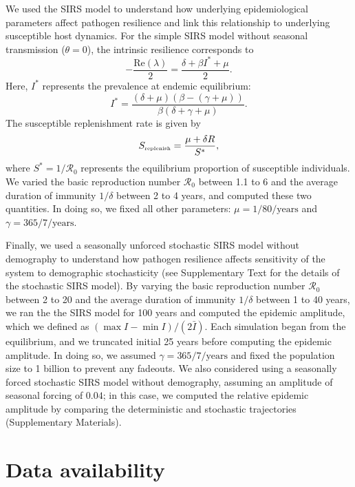 \documentclass[12pt]{article}
\newcommand{\tsub}[2]{#1_{{\textrm{\tiny #2}}}}
\begin{document}
We used the SIRS model to understand how underlying epidemiological parameters affect pathogen resilience and link this relationship to underlying susceptible host dynamics.
For the simple SIRS model without seasonal transmission ($\theta = 0$), the intrinsic resilience corresponds to
\begin{equation}
-\frac{\mathrm{Re}(\lambda)}{2} = \frac{\delta + \beta I^{\ast} + \mu}{2}.
\end{equation}
Here, $I^{\ast}$ represents the prevalence at endemic equilibrium:
\begin{equation}
I^{\ast} = \frac{(\delta + \mu)(\beta - (\gamma + \mu))}{\beta(\delta + \gamma + \mu)}.
\end{equation}
The susceptible replenishment rate is given by
\begin{equation}
\tsub{S}{replenish} = \frac{\mu + \delta R}{S^\ast},
\end{equation}
where $S^\ast = 1/\mathcal R_0$ represents the equilibrium proportion of susceptible individuals.
We varied the basic reproduction number $\mathcal R_0$ between 1.1 to 6 and the average duration of immunity $1/\delta$ between 2 to 4 years, and computed these two quantities.
In doing so, we fixed all other parameters: $\mu=1/80/\mathrm{years}$ and $\gamma=365/7/\mathrm{years}$.

Finally, we used a seasonally unforced stochastic SIRS model without demography to understand how pathogen resilience affects sensitivity of the system to demographic stochasticity (see Supplementary Text for the details of the stochastic SIRS model).
By varying the basic reproduction number $\mathcal R_0$ between 2 to 20 and the average duration of immunity $1/\delta$ between 1 to 40 years, we ran the the SIRS model for 100 years and computed the epidemic amplitude, which we defined as  $(\max I - \min I)/(2 \bar{I})$.
Each simulation began from the equilibrium, and we truncated initial 25 years before computing the epidemic amplitude.
In doing so, we assumed $\gamma=365/7/\mathrm{years}$ and fixed the population size to 1 billion to prevent any fadeouts.
We also considered using a seasonally forced stochastic SIRS model without demography, assuming an amplitude of seasonal forcing of $0.04$;
in this case, we computed the relative epidemic amplitude by comparing the deterministic and stochastic trajectories (Supplementary Materials).

\section*{Data availability}
\end{document}
